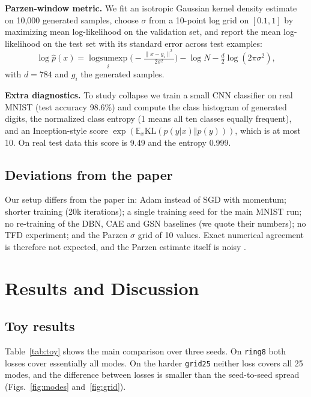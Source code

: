 \documentclass[conference]{IEEEtran}
\newcommand{\E}{\mathbb{E}}
\begin{document}
\textbf{Parzen-window metric.} We fit an isotropic Gaussian kernel density estimate on 10{,}000 generated samples, choose $\sigma$ from a 10-point log grid on $[0.1,1]$ by maximizing mean log-likelihood on the validation set, and report the mean log-likelihood on the test set with its standard error across test examples:
\begin{equation}
\log\hat p(x)=\operatorname*{logsumexp}_i\!\Big(-\tfrac{\lVert x-g_i\rVert^2}{2\sigma^2}\Big)-\log N-\tfrac{d}{2}\log(2\pi\sigma^2),
\label{eq:parzen}
\end{equation}
with $d=784$ and $g_i$ the generated samples.

\textbf{Extra diagnostics.} To study collapse we train a small CNN classifier on real MNIST (test accuracy 98.6\%) and compute the class histogram of generated digits, the normalized class entropy (1 means all ten classes equally frequent), and an Inception-style score $\exp(\E_x\mathrm{KL}(p(y|x)\Vert p(y)))$, which is at most 10. On real test data this score is 9.49 and the entropy 0.999.

\subsection{Deviations from the paper}
Our setup differs from the paper in: Adam instead of SGD with momentum; shorter training (20k iterations); a single training seed for the main MNIST run; no re-training of the DBN, CAE and GSN baselines (we quote their numbers); no TFD experiment; and the Parzen $\sigma$ grid of 10 values. Exact numerical agreement is therefore not expected, and the Parzen estimate itself is noisy \cite{theis2016note}.

\section{Results and Discussion}
\label{sec:results}
\subsection{Toy results}
Table~\ref{tab:toy} shows the main comparison over three seeds. On \texttt{ring8} both losses cover essentially all modes. On the harder \texttt{grid25} neither loss covers all 25 modes, and the difference between losses is smaller than the seed-to-seed spread (Figs.~\ref{fig:modes} and~\ref{fig:grid}).
\end{document}
